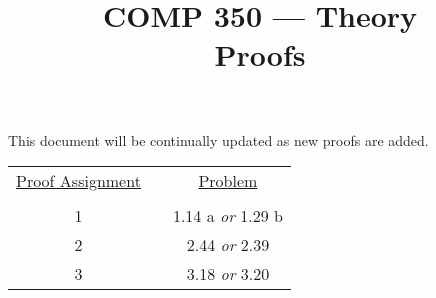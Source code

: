 \documentclass[nobib]{tufte-handout}
\title{COMP 350 --- Theory \\ Proofs}
\begin{document}
\maketitle

This document will be continually updated as new proofs are added.

\begin{center}
\begin{tabular}{ccc}
  \underline{Proof Assignment} & \hspace{.5in} &  \underline{Problem} \\ \\
  1 & & 1.14 a \textit{or} 1.29 b \\
  2 & & 2.44 \textit{or} 2.39 \\
  3 & & 3.18 \textit{or} 3.20 \\
\end{tabular}
\end{center}
\end{document}
